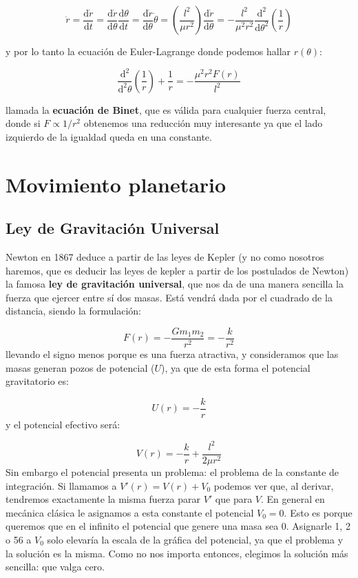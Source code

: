 \documentclass[12pt,a4paper]{book}
\newcommand{\parentesis}[1]{\left( #1  \right)}
\newcommand{\D}{\mathrm{d}}
\begin{document}
\begin{equation}
\ddot{r} = \dfrac{\D \dot{r}}{\D t} = \dfrac{\D \dot{r}}{\D \theta} \dfrac{\D \theta}{\D t} = \dfrac{\D \dot{r}}{\D \theta} \dot{\theta} = \parentesis{\dfrac{l^2}{ \mu r^2}} \dfrac{\D \dot{r}}{\D \theta} = - \dfrac{l^2}{\mu^2 r^2} \dfrac{\D^2}{\D \theta^2} \parentesis{\dfrac{1}{r}}
\end{equation}


y por lo tanto la ecuación de Euler-Lagrange donde podemos hallar $r(\theta)$:

\begin{equation}
\dfrac{\D^2}{\D^2 \theta} \parentesis{\dfrac{1}{r}} + \dfrac{1}{r} = - \dfrac{\mu^2 r^2 F(r)}{l^2}
\end{equation}

llamada la \textbf{ecuación de Binet}, que es válida para cualquier fuerza central, donde si $F \propto 1/r^2$ obtenemos una reducción muy interesante ya que el lado izquierdo de la igualdad queda en una constante.

\section{Movimiento planetario}

\subsection{Ley de Gravitación Universal}

Newton en 1867 deduce a partir de las leyes de Kepler (y no como nosotros haremos, que es deducir las leyes de kepler a partir de los postulados de Newton) la famosa \textbf{ley de gravitación universal}, que nos da de una manera sencilla la fuerza que ejercer entre sí dos masas. Está vendrá dada por el cuadrado de la distancia, siendo la formulación:

\begin{equation}
F(r) = - \dfrac{G m_1 m_2}{r^2} = - \dfrac{k}{r^2}
\end{equation}
llevando el signo menos porque es una fuerza atractiva, y consideramos que las masas generan pozos de potencial ($U$), ya que de esta forma el potencial gravitatorio es:

\begin{equation}
U(r) = - \dfrac{k}{r}
\end{equation}
y el potencial efectivo será:

\begin{equation}
V(r) = - \dfrac{k}{r} + \dfrac{l^2}{2 \mu r^2}
\end{equation}
Sin embargo el potencial presenta un problema: el problema de la constante de integración. Si llamamos a $V'(r) = V(r) + V_0$ podemos ver que, al derivar, tendremos exactamente la misma fuerza parar $V'$ que para $V$. En general en mecánica clásica le asignamos a esta constante el potencial $V_0 = 0$. Esto es porque queremos que en el infinito el potencial que genere una masa sea 0. Asignarle 1, 2 o 56 a $V_0$ solo elevaría la escala de la gráfica del potencial, ya que el problema y la solución es la misma. Como no nos importa entonces, elegimos la solución más sencilla: que valga cero.\\
\end{document}
